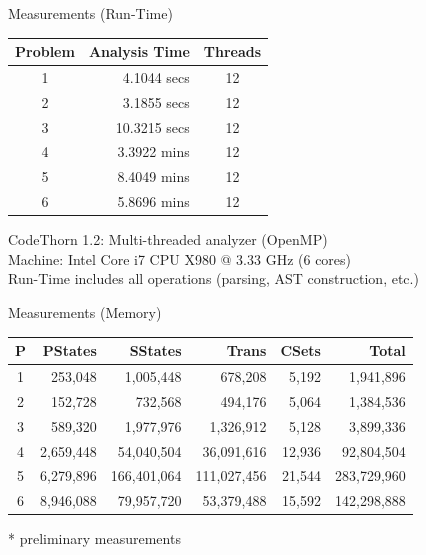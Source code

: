 \begin{frame}{Measurements (Run-Time)}
\begin{center}
\begin{tabular}{|c|r|c|}\hline
Problem& Analysis Time & Threads\\\hline\hline
1& 4.1044 secs & 12\\\hline
2& 3.1855 secs& 12\\\hline
3& 10.3215 secs& 12\\\hline
4& 3.3922 mins& 12\\\hline
5& 8.4049 mins& 12\\\hline
6& 5.8696 mins& 12\\\hline
\end{tabular}

\vspace{0.5cm}
CodeThorn 1.2: Multi-threaded analyzer (OpenMP)\\
Machine: Intel Core i7 CPU X980 @ 3.33 GHz (6 cores)\\
Run-Time includes all operations (parsing, AST construction, etc.) 
\end{center}

\end{frame}

\begin{frame}{Measurements (Memory)}
\begin{center}
\begin{tabular}{|c|r|r|r|r|r|}\hline
P& PStates & SStates &Trans &CSets& Total \\\hline\hline
1 &253,048 & 1,005,448 & 678,208 & 5,192 & 1,941,896\\\hline
2 &152,728 & 732,568 & 494,176 & 5,064 & 1,384,536\\\hline
3 &589,320 & 1,977,976 & 1,326,912 & 5,128 & 3,899,336\\\hline
4 &2,659,448 & 54,040,504 & 36,091,616 & 12,936 & 92,804,504\\\hline
5 &6,279,896 & 166,401,064 & 111,027,456 & 21,544 & 283,729,960\\\hline
6 &8,946,088 & 79,957,720 & 53,379,488 & 15,592 & 142,298,888\\\hline
\end{tabular}
\end{center}

\vspace{0.5cm}
* preliminary measurements

\end{frame}

